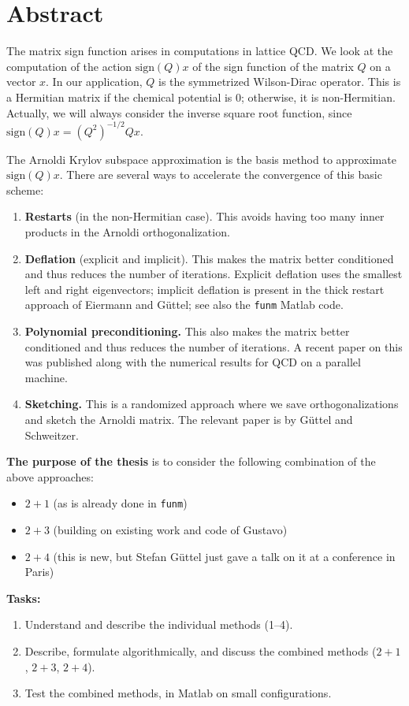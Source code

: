 \section*{Abstract}

The matrix sign function arises in computations in lattice QCD. We look at the computation of the action $\text{sign}(Q)x$ of the sign function of the matrix $Q$ on a vector $x$. In our application, $Q$ is the symmetrized Wilson-Dirac operator. This is a Hermitian matrix if the chemical potential is 0; otherwise, it is non-Hermitian. Actually, we will always consider the inverse square root function, since $\text{sign}(Q)x = (Q^2)^{-1/2}Qx$.

The Arnoldi Krylov subspace approximation is the basis method to approximate $\text{sign}(Q)x$. There are several ways to accelerate the convergence of this basic scheme:
\begin{enumerate}
    \item \textbf{Restarts} (in the non-Hermitian case). This avoids having too many inner products in the Arnoldi orthogonalization.
    \item \textbf{Deflation} (explicit and implicit). This makes the matrix better conditioned and thus reduces the number of iterations. Explicit deflation uses the smallest left and right eigenvectors; implicit deflation is present in the thick restart approach of Eiermann and Güttel; see also the \texttt{funm} Matlab code.
    \item \textbf{Polynomial preconditioning.} This also makes the matrix better conditioned and thus reduces the number of iterations. A recent paper on this was published along with the numerical results for QCD on a parallel machine.
    \item \textbf{Sketching.} This is a randomized approach where we save orthogonalizations and sketch the Arnoldi matrix. The relevant paper is by Güttel and Schweitzer.
\end{enumerate}

\textbf{The purpose of the thesis} is to consider the following combination of the above approaches:
\begin{itemize}
    \item $2 + 1$ (as is already done in \texttt{funm})
    \item $2 + 3$ (building on existing work and code of Gustavo)
    \item $2 + 4$ (this is new, but Stefan Güttel just gave a talk on it at a conference in Paris)
\end{itemize}

\textbf{Tasks:}
\begin{enumerate}
    \item Understand and describe the individual methods (1--4).
    \item Describe, formulate algorithmically, and discuss the combined methods ($2+1$, $2+3$, $2+4$).
    \item Test the combined methods, in Matlab on small configurations.
\end{enumerate}




